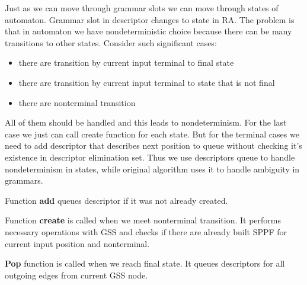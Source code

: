 \documentclass[runningheads,a4paper]{llncs}
\begin{document}
Just as we can move through grammar slots we can move through states 
of automaton. Grammar slot in descriptor changes to state in RA.
The problem is that in automaton we have nondeterministic choice because there can be 
many transitions to other states. Consider such significant cases:
\begin{itemize} 
\item there are transition by current input terminal to final state
\item there are transition by current input terminal to state that is not final
\item there are nonterminal transition
\end{itemize}

All of them should be handled and this leads to nondeterminism. 
For the last case we just can call create function for each state.
But for the terminal cases we need to add descriptor that describes
next position to queue without checking it's existence in descriptor elimination set.
Thus we use descriptors queue to handle nondeterminism in states, while original algorithm uses it to 
handle ambiguity in grammars.



Function \textbf{add} queues descriptor if it was not already created.


Function \textbf{create} is called when we meet nonterminal transition.
It performs necessary operations with GSS and checks if there are already built SPPF for current
input position and nonterminal.

\textbf{Pop} function is called when we reach final state. It queues descriptors for all outgoing edges from current GSS node.
\end{document}
